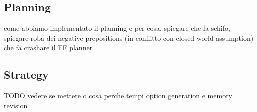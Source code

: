     \subsection{Planning}
        come abbiamo implementato il planning e per cosa, spiegare che fa schifo, spiegare roba dei negative prepositions (in conflitto con closed world assumption) che fa crashare il FF planner

    \subsection{Strategy}
        TODO vedere se mettere o cosa
        perche tempi option generation e memory revision
